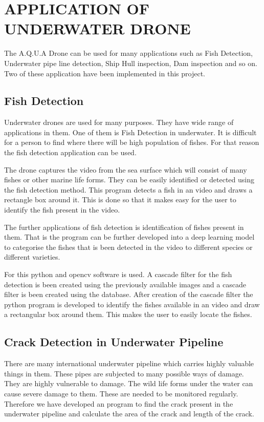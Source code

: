 \chapter{APPLICATION OF UNDERWATER DRONE}\thispagestyle{EmptyHeader}
\label{chp:1}

The A.Q.U.A Drone can be used for many applications such as Fish Detection, Underwater pipe line detection, Ship Hull inspection, Dam inspection and so on. Two of these application have been implemented in this project.

\section{Fish Detection}
Underwater drones are used for many purposes. They have wide range of applications in them. One of them is Fish Detection in underwater. It is difficult for a person to find where there will be high population of fishes. For that reason the fish detection application can be used.

The drone captures the video from the sea surface which will consist of many fishes or other marine life forms. They can be easily identified or detected using the fish detection method. This program detects a fish in an video and draws a rectangle box around it. This is done so that it makes easy for the user to identify the fish present in the video.

The further applications of fish detection is identification of fishes present in them. That is the program can be further developed into a deep learning model to categorise the fishes that is been detected in the video to different species or different varieties.

For this python and opencv software is used. A cascade filter for the fish detection is been created using the previously available images and a cascade filter is been created using the database. After creation of the cascade filter the python program is developed to identify the fishes available in an video and draw a rectangular box around them. This makes the user to easily locate the fishes.

\section{Crack Detection in Underwater Pipeline}
There are many international underwater pipeline which carries highly valuable things in them. These pipes are subjected to many possible ways of damage. They are highly vulnerable to damage. The wild life forms under the water can cause severe damage to them. These are needed to be monitored regularly. Therefore we have developed an program to find the crack present in the underwater pipeline and calculate the area of the crack and length of the crack.

